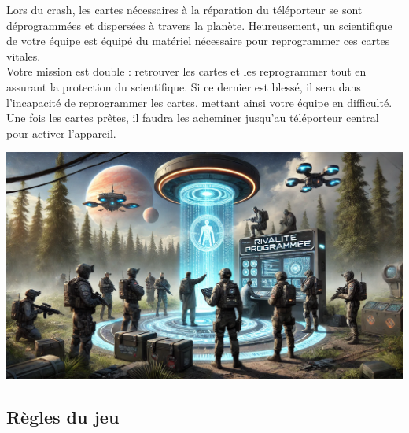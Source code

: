\documentclass{template}
\begin{document}
\begin{minipage}[t]{0.48\textwidth}
    Lors du crash, les cartes nécessaires à la réparation du téléporteur se sont déprogrammées et dispersées à travers la planète. Heureusement, un scientifique de votre équipe est équipé du matériel nécessaire pour reprogrammer ces cartes vitales. \\
    
    Votre mission est double : retrouver les cartes et les reprogrammer tout en assurant la protection du scientifique. Si ce dernier est blessé, il sera dans l’incapacité de reprogrammer les cartes, mettant ainsi votre équipe en difficulté. Une fois les cartes prêtes, il faudra les acheminer jusqu’au téléporteur central pour activer l’appareil.
\end{minipage}
\hfill
\begin{minipage}[t]{0.48\textwidth}
    \vspace{0em}
    \includegraphics[width=\linewidth]{docs/img/variante4.png}
\end{minipage}


\subsection*{Règles du jeu}
\end{document}
